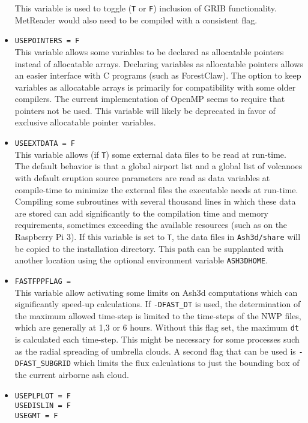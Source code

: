 \begin{itemize}
This variable is used to toggle (\texttt{T} or \texttt{F}) inclusion of GRIB
functionality.  MetReader would also need to be compiled with a consistent flag.
 \item \texttt{USEPOINTERS = F}\\
This variable allows some variables to be declared as allocatable pointers instead
of allocatable arrays.  Declaring variables as allocatable pointers allows an easier
interface with C programs (such as ForestClaw).  The option to keep variables as
allocatable arrays is primarily for compatibility with some older compilers.  The
current implementation of OpenMP seems to require that pointers not be used.
This variable
will likely be deprecated in favor of exclusive allocatable pointer variables.
 \item \texttt{USEEXTDATA = F}\\
This variable allows (if \texttt{T}) some external data files to be read at run-time.
The default behavior is that a global airport list and a global list of volcanoes with
default eruption source parameters are read as data variables at compile-time
to minimize the external files the executable needs at run-time.  Compiling
some subroutines with several thousand lines in which these data are stored can add
significantly to the compilation time and memory requirements, sometimes exceeding
the available resources (such as on the Raspberry Pi 3).  If this variable is set to
\texttt{T}, the data files in \texttt{Ash3d/share} will be copied to the installation
directory.  This path can be supplanted with another location using the optional
environment variable \texttt{ASH3DHOME}.
 \item \texttt{FASTFPPFLAG = }\\
This variable allow activating some limits on Ash3d computations which can significantly
speed-up calculations.  If \texttt{-DFAST\_DT} is used, the determination of the
maximum allowed time-step is limited to the time-steps of the NWP files, which are
generally at 1,3 or 6 hours.  Without this flag set, the maximum \texttt{dt} is
calculated each time-step.  This might be necessary for some processes such as
the radial spreading of umbrella clouds.  A second flag that can be used is
\texttt{-DFAST\_SUBGRID} which limits the flux calculations to just the bounding
box of the current airborne ash cloud.
 \item \texttt{USEPLPLOT = F}\\
 \texttt{USEDISLIN = F}\\
 \texttt{USEGMT = F}\\

\end{itemize}
